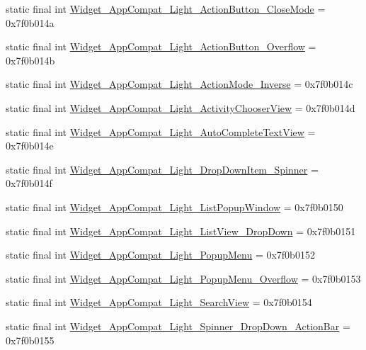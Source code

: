 \begin{CompactItemize}
\item 
static final int \hyperlink{classandroid_1_1support_1_1fragment_1_1_r_1_1style_0f29b03a2786c55d937d04a6c10475d4}{Widget\_\-AppCompat\_\-Light\_\-ActionButton\_\-CloseMode} = 0x7f0b014a
\item 
static final int \hyperlink{classandroid_1_1support_1_1fragment_1_1_r_1_1style_4ce74cb868518fe4098530688ba78536}{Widget\_\-AppCompat\_\-Light\_\-ActionButton\_\-Overflow} = 0x7f0b014b
\item 
static final int \hyperlink{classandroid_1_1support_1_1fragment_1_1_r_1_1style_0b9b05c22f959cad86cba0167beb8629}{Widget\_\-AppCompat\_\-Light\_\-ActionMode\_\-Inverse} = 0x7f0b014c
\item 
static final int \hyperlink{classandroid_1_1support_1_1fragment_1_1_r_1_1style_fc29f68857aa2f6cdf385db51329bd67}{Widget\_\-AppCompat\_\-Light\_\-ActivityChooserView} = 0x7f0b014d
\item 
static final int \hyperlink{classandroid_1_1support_1_1fragment_1_1_r_1_1style_7c58b4cb104abe034521b3be06144bb2}{Widget\_\-AppCompat\_\-Light\_\-AutoCompleteTextView} = 0x7f0b014e
\item 
static final int \hyperlink{classandroid_1_1support_1_1fragment_1_1_r_1_1style_560c488b98645929e9b2783a35d9b203}{Widget\_\-AppCompat\_\-Light\_\-DropDownItem\_\-Spinner} = 0x7f0b014f
\item 
static final int \hyperlink{classandroid_1_1support_1_1fragment_1_1_r_1_1style_fef760b46d5b7aef44d3104b054caee7}{Widget\_\-AppCompat\_\-Light\_\-ListPopupWindow} = 0x7f0b0150
\item 
static final int \hyperlink{classandroid_1_1support_1_1fragment_1_1_r_1_1style_772f7653abc5bbdf7cdfc3c142289006}{Widget\_\-AppCompat\_\-Light\_\-ListView\_\-DropDown} = 0x7f0b0151
\item 
static final int \hyperlink{classandroid_1_1support_1_1fragment_1_1_r_1_1style_8674dceaf404d986b22385689790b580}{Widget\_\-AppCompat\_\-Light\_\-PopupMenu} = 0x7f0b0152
\item 
static final int \hyperlink{classandroid_1_1support_1_1fragment_1_1_r_1_1style_48661ea93198bf6645e7ffd4e356222f}{Widget\_\-AppCompat\_\-Light\_\-PopupMenu\_\-Overflow} = 0x7f0b0153
\item 
static final int \hyperlink{classandroid_1_1support_1_1fragment_1_1_r_1_1style_d7b138bd0de9c8bf5415d4f95810e409}{Widget\_\-AppCompat\_\-Light\_\-SearchView} = 0x7f0b0154
\item 
static final int \hyperlink{classandroid_1_1support_1_1fragment_1_1_r_1_1style_b8daaa140005ce292e519ccfb8967b15}{Widget\_\-AppCompat\_\-Light\_\-Spinner\_\-DropDown\_\-ActionBar} = 0x7f0b0155

\end{CompactItemize}

